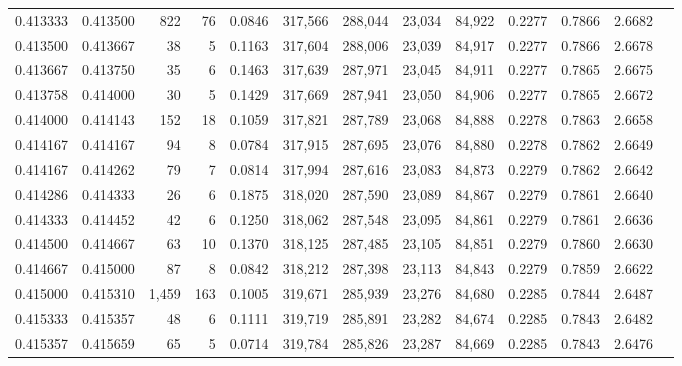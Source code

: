 \begin{tabular}{rrrrrrrrrrrrr}
0.413333 & 0.413500 &   822 &  76 &                                     0.0846 & 317,566 & 288,044 &  23,034 &  84,922 & 0.2277 & 0.7866 & 2.6682 \\
0.413500 & 0.413667 &    38 &   5 &                                     0.1163 & 317,604 & 288,006 &  23,039 &  84,917 & 0.2277 & 0.7866 & 2.6678 \\
0.413667 & 0.413750 &    35 &   6 &                                     0.1463 & 317,639 & 287,971 &  23,045 &  84,911 & 0.2277 & 0.7865 & 2.6675 \\
0.413758 & 0.414000 &    30 &   5 &                                     0.1429 & 317,669 & 287,941 &  23,050 &  84,906 & 0.2277 & 0.7865 & 2.6672 \\
0.414000 & 0.414143 &   152 &  18 &                                     0.1059 & 317,821 & 287,789 &  23,068 &  84,888 & 0.2278 & 0.7863 & 2.6658 \\
0.414167 & 0.414167 &    94 &   8 &                                     0.0784 & 317,915 & 287,695 &  23,076 &  84,880 & 0.2278 & 0.7862 & 2.6649 \\
0.414167 & 0.414262 &    79 &   7 &                                     0.0814 & 317,994 & 287,616 &  23,083 &  84,873 & 0.2279 & 0.7862 & 2.6642 \\
0.414286 & 0.414333 &    26 &   6 &                                     0.1875 & 318,020 & 287,590 &  23,089 &  84,867 & 0.2279 & 0.7861 & 2.6640 \\
0.414333 & 0.414452 &    42 &   6 &                                     0.1250 & 318,062 & 287,548 &  23,095 &  84,861 & 0.2279 & 0.7861 & 2.6636 \\
0.414500 & 0.414667 &    63 &  10 &                                     0.1370 & 318,125 & 287,485 &  23,105 &  84,851 & 0.2279 & 0.7860 & 2.6630 \\
0.414667 & 0.415000 &    87 &   8 &                                     0.0842 & 318,212 & 287,398 &  23,113 &  84,843 & 0.2279 & 0.7859 & 2.6622 \\
0.415000 & 0.415310 & 1,459 & 163 &                                     0.1005 & 319,671 & 285,939 &  23,276 &  84,680 & 0.2285 & 0.7844 & 2.6487 \\
0.415333 & 0.415357 &    48 &   6 &                                     0.1111 & 319,719 & 285,891 &  23,282 &  84,674 & 0.2285 & 0.7843 & 2.6482 \\
0.415357 & 0.415659 &    65 &   5 &                                     0.0714 & 319,784 & 285,826 &  23,287 &  84,669 & 0.2285 & 0.7843 & 2.6476 \\

\end{tabular}
